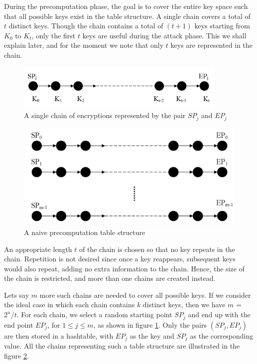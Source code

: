 During the precomputation phase, the goal is to cover the entire key space such that all possible keys exist in the table structure. A single chain covers a total of $t$ distinct keys. Though the chain contains a total of $(t+1)$ keys starting from $K_0$ to $K_{t}$, only the first $t$ keys are useful during the attack phase. This we shall explain later, and for the moment we note that only $t$ keys are represented in the chain.

\begin{figure}[ht!]
	\centering
		\includegraphics[width=4in]{./figures/single-chain.PNG}
	\caption{A single chain of encryptions represented by the pair $SP_j$ and $EP_j$}	
	\label{fig:single-chain}
\end{figure}

\begin{figure}[ht!]
	\centering
		\includegraphics[width=4.5in]{./figures/naive-hellman-table.PNG}
	\caption{A naive precomputation table structure}	
	\label{fig:naive-hellman-table}
\end{figure}

An appropriate length $t$ of the chain is chosen so that no key repeats in the chain. Repetition is not desired since once a key reappears, subsequent keys would also repeat, adding no extra information to the chain. Hence, the size of the chain is restricted, and more than one chains are created instead. 

Lets say $m$ more such chains are needed to cover all possible keys. If we consider the ideal case in which each chain contains $k$ distinct keys, then we have $m$ = $2^n/t$. For each chain, we select a random starting point $SP_j$ and end up with the end point $EP_j$, for $1 \leq j \leq m$, as shown in figure \ref{fig:single-chain}. Only the pairs $(SP_j,EP_j)$ are then stored in a hashtable, with $EP_j$ as the key and $SP_j$ as the corresponding value. All the chains representing such a table structure are illustrated in the figure \ref{fig:naive-hellman-table}.

